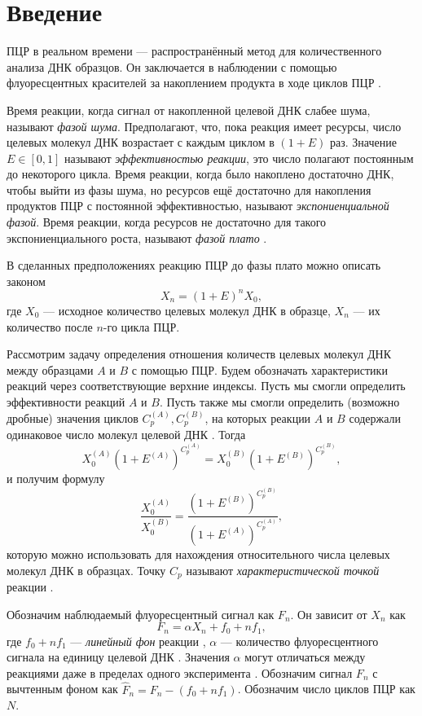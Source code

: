 
\section{Введение}

ПЦР в реальном времени --- распространённый метод для количественного анализа
ДНК образцов. Он заключается в наблюдении с помощью флуоресцентных красителей
за накоплением продукта в ходе циклов ПЦР
\cite{kubistaRealtimePolymeraseChain2006}.

Время реакции, когда сигнал от накопленной целевой ДНК слабее шума, называют
{\it фазой шума}. Предполагают, что, пока реакция имеет ресурсы, число
целевых молекул ДНК возрастает с каждым циклом в $(1+E)$ раз. Значение
$E\in[0,1]$ называют {\it эффективностью реакции}, это число полагают
постоянным до некоторого цикла. Время реакции, когда было накоплено достаточно
ДНК, чтобы выйти из фазы шума, но ресурсов ещё достаточно для накопления
продуктов ПЦР с постоянной эффективностью, называют {\it экспониенциальной
фазой}. Время реакции, когда ресурсов не достаточно для такого
экспониенциального роста, называют {\it фазой плато}
\cite{rebrikovRealtimePCRReview2006}.

В сделанных предположениях реакцию ПЦР до фазы плато можно описать законом
\[
  X_{n}=(1+E)^{n}X_0,
\]
где $X_0$ --- исходное количество целевых молекул ДНК в образце, $X_{n}$ ---
их количество после $n$-го цикла ПЦР.

Рассмотрим задачу определения отношения количеств целевых молекул ДНК между
образцами $A$ и $B$ с помощью ПЦР. Будем обозначать характеристики реакций
через соответствующие верхние индексы. Пусть мы смогли определить эффективности
реакций $A$ и $B$. Пусть также мы смогли определить (возможно дробные)
значения циклов $C_{p}^{(A)}, C_{p}^{(B)}$, на которых реакции $A$ и $B$
содержали одинаковое число молекул целевой ДНК
\cite{rasmussenQuantificationLightCycler2001}. Тогда
\[
  X_0^{(A)}(1+E^{(A)})^{C_{p}^{(A)}}=
  X_0^{(B)}(1+E^{(B)})^{C_{p}^{(B)}},
\]
и получим формулу
\[
  \frac{X_0^{(A)}}{X_0^{(B)}}=
  \frac{(1+E^{(B)})^{C_{p}^{(B)}}}{(1+E^{(A)})^{C_{p}^{(A)}}},
\]
которую можно использовать для нахождения относительного числа целевых молекул
ДНК в образцах. Точку $C_{p}$ называют {\it характеристической точкой} реакции
\cite{rebrikovPCRRealnomVremeni2009}.

Обозначим наблюдаемый флуоресцентный сигнал как $F_{n}$. Он зависит
от $X_{n}$ как
\begin{equation}\label{eq:signal}
  F_{n}=\alpha X_{n} + f_0+nf_1,
\end{equation}
где $f_0+nf_1$ --- {\it линейный фон} реакции
\cite{peccoudStatisticalEstimationsPCR1998}, $\alpha$ --- количество
флуоресцентного сигнала на единицу целевой ДНК
\cite{rebrikovRealtimePCRReview2006}. Значения $\alpha$ могут отличаться между
реакциями даже в пределах одного эксперимента
\cite{rebrikovRealtimePCRReview2006,larionovStandardCurveBased2005}. Обозначим
сигнал $F_{n}$ с вычтенным фоном как $\hat F_{n}=F_{n}-(f_0+nf_1)$. Обозначим
число циклов ПЦР как $N$.

